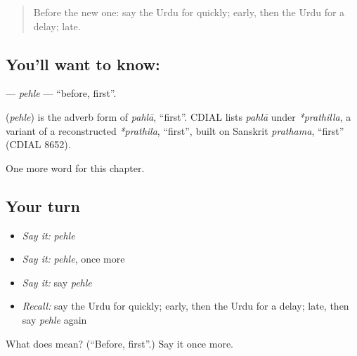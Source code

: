 \begin{quote}
Before the new one: say the Urdu for quickly; early, then the Urdu for a delay; late.
\end{quote}

\subsection*{You'll want to know: }
\textbf{} — \emph{pehle} — \textquotedblleft{}before, first\textquotedblright{}.

\begin{cousinweb}
\textbf{} (\emph{pehle}) is the adverb form of \emph{pahlā}, \textquotedblleft{}first\textquotedblright{}. CDIAL lists \emph{pahlā} under \emph{*prathilla}, a variant of a reconstructed \emph{*prathila}, \textquotedblleft{}first\textquotedblright{}, built on Sanskrit \emph{prathama}, \textquotedblleft{}first\textquotedblright{} (CDIAL 8652).
\end{cousinweb}

\begin{grammarlens}[title={What you've built}]
One more word for this chapter.
\end{grammarlens}

\subsection*{Your turn}
\begin{itemize}
\raggedright
  \item \emph{Say it:} \emph{pehle}
  \item \emph{Say it:} \emph{pehle}, once more
  \item \emph{Say it:} say \emph{pehle}
  \item \emph{Recall:} say the Urdu for quickly; early, then the Urdu for a delay; late, then say \emph{pehle} again
\end{itemize}

\begin{tcolorbox}[breakable,colback=teal!4,colframe=teal!35!black,title={Before you move on}]
What does  mean? (\textquotedblleft{}Before, first\textquotedblright{}.) Say it once more.
\end{tcolorbox}
